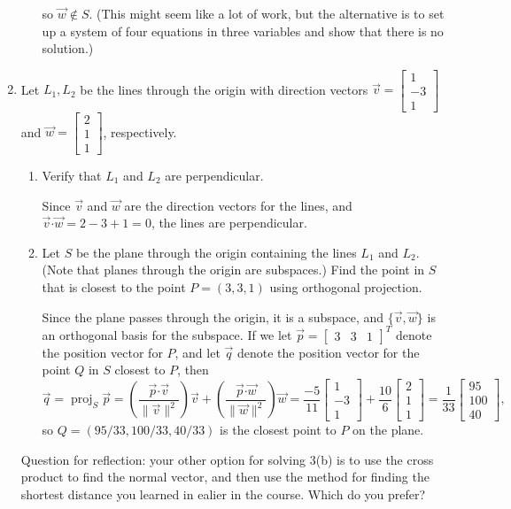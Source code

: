 \documentclass[12pt]{article}
\newcommand{\len}[1]{\lVert #1\rVert}
\newcommand{\dotp}{\boldsymbol{\cdot}}
\newcommand{\bbm}{\begin{bmatrix}}
\newcommand{\ebm}{\end{bmatrix}}
\DeclareMathOperator{\proj}{proj}
\begin{document}
\begin{enumerate}
\begin{enumerate}
\[\]
so $\vec{w}\notin S$. (This might seem like a lot of work, but the alternative is to set up a system of four equations in three variables and show that there is no solution.)
\end{enumerate}
\item Let $L_1, L_2$ be the lines through the origin with direction vectors $\vec{v} = \bbm 1\\-3\\1\ebm$ and $\vec{w} = \bbm 2\\1\\1\ebm$, respectively. 
\begin{enumerate}
 \item Verify that $L_1$ and $L_2$ are perpendicular.

\bigskip

Since $\vec{v}$ and $\vec{w}$ are the direction vectors for the lines, and $\vec{v}\dotp \vec{w} = 2-3+1 =0$, the lines are perpendicular.

 \item Let $S$ be the plane through the origin containing the lines $L_1$ and $L_2$. (Note that planes through the origin are subspaces.) Find the point in $S$ that is closest to the point $P=(3,3,1)$ using orthogonal projection. 

Since the plane passes through the origin, it is a subspace, and $\{\vec{v},\vec{w}\}$ is an orthogonal basis for the subspace. If we let $\vec{p}=\bbm 3&3&1\ebm^T$ denote the position vector for $P$, and let $\vec{q}$ denote the position vector for the point $Q$ in $S$ closest to $P$, then
\[
 \vec{q}=\proj_S\vec{p} = \left(\frac{\vec{p}\dotp\vec{v}}{\len{\vec{v}}^2}\right)\vec{v}+\left(\frac{\vec{p}\dotp\vec{w}}{\len{\vec{w}}^2}\right)\vec{w} = \frac{-5}{11}\bbm 1\\-3\\1\ebm +\frac{10}{6}\bbm 2\\1\\1\ebm = \frac{1}{33}\bbm 95\\100\\40\ebm,
\]
so $Q=(95/33, 100/33, 40/33)$ is the closest point to $P$ on the plane.
\end{enumerate}
Question for reflection: your other option for solving 3(b) is to use the cross product to find the normal vector, and then use the method for finding the shortest distance you learned in ealier in the course. Which do you prefer?

\bigskip


\end{enumerate}
\end{document}
